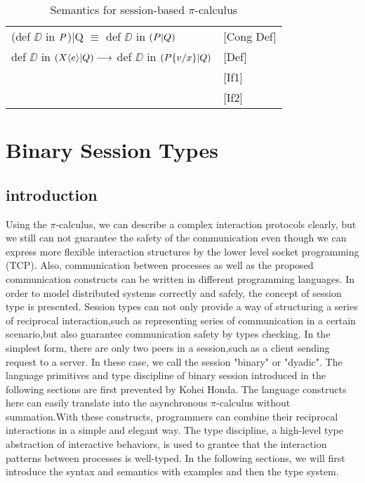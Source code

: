 \documentclass[a4paper]{article}
\begin{document}
\begin{table}
\centering
\begin{tabular}{ll}
(def $\DD$ in $P$)|Q $\equiv$ def $\DD$ in $(P|Q)$&[Cong Def]\\
def $\DD$ in $(X\langle e \rangle | Q) \longrightarrow$ def $\DD$ in $(P\{v/x\} | Q)$&[Def]\\
&[If1]\\
&[If2]\\

\end{tabular}
\caption{Semantics for session-based \(\pi\)-calculus}
\end{table}


\newcommand{\branb}{\ensuremath k \triangleright {l_{1} : \PP_{1} | \ldots | l_{n} : \PP_{n}} }
\newcommand{\selecb}{\ensuremath k \triangleleft l.\PP}

\section{Binary Session Types}
\subsection{introduction}
Using the \(\pi\)-calculus, we can describe a complex interaction protocols clearly, but we still can not guarantee the safety of the communication even though we can express more flexible interaction structures by the lower level socket programming (TCP). Also, communication between processes as well as the proposed communication constructs can be written in different programming languages. In order to model distributed systems correctly and safely, the concept of session type is presented. Session types can not only provide a way of structuring a series of reciprocal interaction,such as representing series of communication in a certain scenario,but also guarantee communication safety by types checking. In the simplest form, there are only two peers in a session,such as a client sending request to a server. In these case, we call the session "binary"  or  "dyadic". The language primitives and type discipline of binary session introduced in the following sections are first prevented by Kohei Honda. The language constructs here can easily translate into the asynchronous \(\pi\)-calculus without summation.With these constructs, programmers can combine their reciprocal interactions in a simple and elegant way. The type discipline, a high-level type abstraction of interactive behaviors, is used to grantee that the interaction patterns between processes is well-typed. In the following sections, we will first introduce the syntax and semantics with examples and then the type system.
\end{document}
